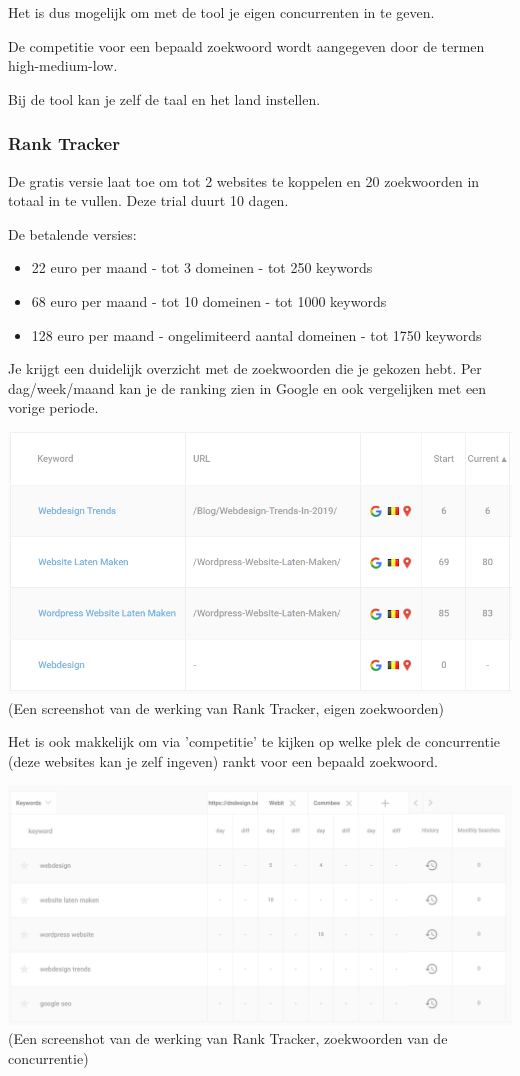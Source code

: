Het is dus mogelijk om met de tool je eigen concurrenten in te geven.

De competitie voor een bepaald zoekwoord wordt aangegeven door de termen high-medium-low. 

Bij de tool kan je zelf de taal en het land instellen. 

\subsubsection{Rank Tracker}
\label{ch: Rank Tracker}

De gratis versie laat toe om tot 2 websites te koppelen en 20 zoekwoorden in totaal in te vullen. Deze trial duurt 10 dagen. 

De betalende versies: 
\begin{itemize}
\item 22 euro per maand - tot 3 domeinen - tot 250 keywords
\item 68 euro per maand - tot 10 domeinen - tot 1000 keywords
\item 128 euro per maand - ongelimiteerd aantal domeinen - tot 1750 keywords
\end{itemize}

Je krijgt een duidelijk overzicht met de zoekwoorden die je gekozen hebt. Per dag/week/maand kan je de ranking zien in Google en ook vergelijken met een vorige periode. 

\includegraphics[width=\linewidth]{Bachelorproef/bachelor/img/ranktracker.PNG}
(Een screenshot van de werking van Rank Tracker, eigen zoekwoorden)

Het is ook makkelijk om via 'competitie' te kijken op welke plek de concurrentie (deze websites kan je zelf ingeven) rankt voor een bepaald zoekwoord.

\includegraphics[width=\linewidth]{Bachelorproef/bachelor/img/ranktrackercom.PNG}
(Een screenshot van de werking van Rank Tracker, zoekwoorden van de concurrentie)

